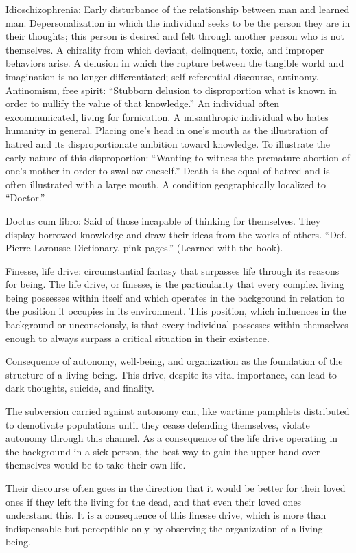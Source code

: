 \documentclass[12pt,oneside]{article}
\begin{document}
Idioschizophrenia: Early disturbance of the relationship between man and learned man. Depersonalization in which the individual seeks to be the person they are in their thoughts; this person is desired and felt through another person who is not themselves. A chirality from which deviant, delinquent, toxic, and improper behaviors arise. A delusion in which the rupture between the tangible world and imagination is no longer differentiated; self‑referential discourse, antinomy. Antinomism, free spirit: “Stubborn delusion to disproportion what is known in order to nullify the value of that knowledge.” An individual often excommunicated, living for fornication. A misanthropic individual who hates humanity in general. Placing one’s head in one’s mouth as the illustration of hatred and its disproportionate ambition toward knowledge. To illustrate the early nature of this disproportion: “Wanting to witness the premature abortion of one’s mother in order to swallow oneself.” Death is the equal of hatred and is often illustrated with a large mouth. A condition geographically localized to “Doctor.”

Doctus cum libro: Said of those incapable of thinking for themselves. They display borrowed knowledge and draw their ideas from the works of others. “Def. Pierre Larousse Dictionary, pink pages.” (Learned with the book).

Finesse, life drive: circumstantial fantasy that surpasses life through its reasons for being. The life drive, or finesse, is the particularity that every complex living being possesses within itself and which operates in the background in relation to the position it occupies in its environment. This position, which influences in the background or unconsciously, is that every individual possesses within themselves enough to always surpass a critical situation in their existence.

Consequence of autonomy, well‑being, and organization as the foundation of the structure of a living being. This drive, despite its vital importance, can lead to dark thoughts, suicide, and finality.

The subversion carried against autonomy can, like wartime pamphlets distributed to demotivate populations until they cease defending themselves, violate autonomy through this channel. As a consequence of the life drive operating in the background in a sick person, the best way to gain the upper hand over themselves would be to take their own life.

Their discourse often goes in the direction that it would be better for their loved ones if they left the living for the dead, and that even their loved ones understand this. It is a consequence of this finesse drive, which is more than indispensable but perceptible only by observing the organization of a living being.
\end{document}
